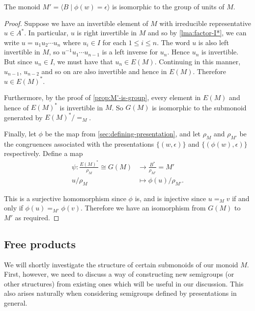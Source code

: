 \documentclass[noindex,noinsetproof,12pt]{lmaths}
\begin{document}
\begin{theorem}
	The monoid $M' = \langle B \mid \phi(w) = \epsilon \rangle$ is isomorphic to the group of units of $M$. \incomplete
\end{theorem}
\begin{proof}
	Suppose we have an invertible element of $M$ with irreducible representative $u \in A^*$. In particular, $u$ is right invertible in $M$ and so by \cref{lma:factor-I*}, we can write $u = u_1u_2\cdots u_n$ where $u_i \in I$ for each $1 \le i \le n$. The word $u$ is also left invertible in $M$, so $u^{-1}u_1\cdots u_{n-1}$ is a left inverse for $u_n$.
	Hence $u_n$ is invertible. But since $u_n \in I$, we must have that $u_n \in E(M)$. Continuing in this manner, $u_{n-1}$, $u_{n-2}$ and so on are also invertible and hence in $E(M)$. Therefore $u \in E(M)^*$.

	Furthermore, by the proof of \cref{prop:M'-is-group}, every element in $E(M)$ and hence of $E(M)^*$ is invertible in $M$. So $G(M)$ is isomorphic to the submonoid generated by $E(M)^*/{=_M}$.

	Finally, let $\phi$ be the map from \cref{sec:defining-presentation}, and let $\rho_M$ and $\rho_{M'}$ be the congruences associated with the presentations $\{(w, \epsilon)\}$ and $\{(\phi(w), \epsilon)\}$ respectively. Define a map
	\begin{align*}
		\psi : \frac{E(M)^*}{\rho_M} \cong G(M) &\to \frac{B^*}{\rho_{M'}} = M' \\
		u/\rho_M &\mapsto \phi(u)/\rho_{M'}.
	\end{align*}

	This is a surjective homomorphism since $\phi$ is, and is injective since $u =_M v$ if and only if $\phi(u) =_{M'} \phi(v)$. Therefore we have an isomorphism from $G(M)$ to $M'$ as required.
\end{proof}


\subsection{Free products}

We will shortly investigate the structure of certain submonoids of our monoid $M$. First, however, we need to discuss a way of constructing new semigroups (or other structures) from existing ones which will be useful in our discussion. This  also arises naturally when considering semigroups defined by presentations in general.
\end{document}
